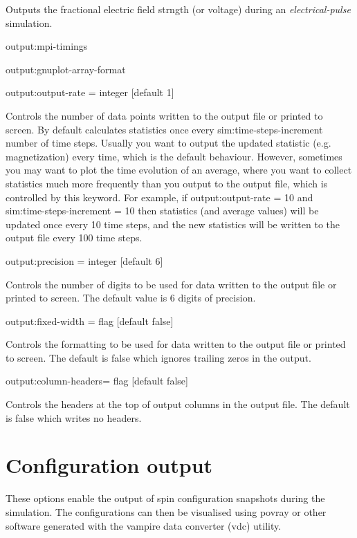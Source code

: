 Outputs the fractional electric field strngth (or voltage) during an \textit{electrical-pulse} simulation.

{\zicf output:mpi-timings}

{\zicf output:gnuplot-array-format}

{\zicf output:output-rate = integer [default 1]} Controls the number of data points written to the output file or printed to screen. By default \vampire calculates statistics once every sim:time-steps-increment number of time steps. Usually you want to output the updated statistic (e.g. magnetization) every time, which is the default behaviour. However, sometimes you may want to plot the time evolution of an average, where you want to collect statistics much more frequently than you output to the output file, which is controlled by this keyword. For example, if output:output-rate = 10 and sim:time-steps-increment = 10 then statistics (and average values) will be updated once every 10 time steps, and the new statistics will be written to the output file every 100 time steps.

{\zicf output:precision = integer [default 6]} Controls the number of digits to be used for data written to the output file or printed to screen. The default value is 6 digits of precision.

{\zicf output:fixed-width = flag [default false]} Controls the formatting to be used for data written to the output file or printed to screen. The default is false which ignores trailing zeros in the output.

{\zicf output:column-headers= flag [default false]} Controls the headers at the top of output columns in the output file. The default is false which writes no headers.




\section*{Configuration output}
 These options enable the output of spin configuration snapshots during the simulation. The configurations can then be visualised using povray or other software generated with the vampire data converter (vdc) utility.

